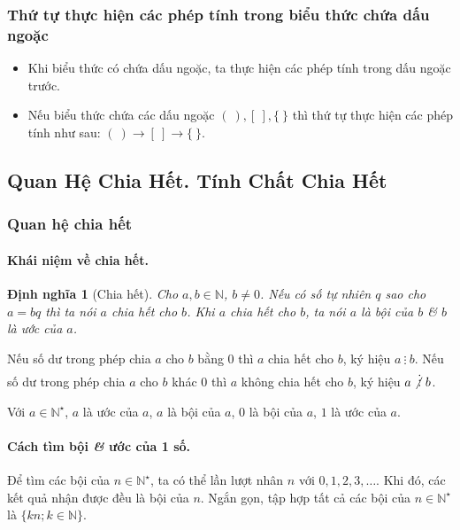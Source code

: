 \documentclass{article}
\numberwithin{equation}{section}
\newtheorem{definition}{Định nghĩa}[section]
\begin{document}
\subsubsection{Thứ tự thực hiện các phép tính trong biểu thức chứa dấu ngoặc}
\begin{tcolorbox}
	\begin{itemize}
		\item Khi biểu thức có chứa dấu ngoặc, ta thực hiện các phép tính trong dấu ngoặc trước.
		\item Nếu biểu thức chứa các dấu ngoặc $(\ ),[\ ],\{\ \}$ thì thứ tự thực hiện các phép tính như sau: $(\ )\to[\ ]\to\{\ \}$.
	\end{itemize}	
\end{tcolorbox}

\subsection{Quan Hệ Chia Hết. Tính Chất Chia Hết}

\subsubsection{Quan hệ chia hết}

\paragraph{Khái niệm về chia hết.}
\begin{definition}[Chia hết]
	Cho $a,b\in\mathbb{N}$, $b\ne 0$. Nếu có số tự nhiên $q$ sao cho $a = bq$ thì ta nói \emph{$a$ chia hết cho $b$}. Khi $a$ chia hết cho $b$, ta nói $a$ là \emph{bội} của $b$ \textit{\&} $b$ là \emph{ước} của $a$.
\end{definition}
Nếu số dư trong phép chia $a$ cho $b$ bằng 0 thì $a$ chia hết cho $b$, ký hiệu $a\ \vdots\ b$. Nếu số dư trong phép chia $a$ cho $b$ khác 0 thì $a$ không chia hết cho $b$, ký hiệu $a\not\vdots\ b$.

Với $a\in\mathbb{N}^\star$, $a$ là ước của $a$, $a$ là bội của $a$, 0 là bội của $a$, $1$ là ước của $a$.

\paragraph{Cách tìm bội \textit{\&} ước của 1 số.} Để tìm các bội của $n\in\mathbb{N}^\star$, ta có thể lần lượt nhân $n$ với $0,1,2,3,\ldots$. Khi đó, các kết quả nhận được đều là bội của $n$. Ngắn gọn, tập hợp tất cả các bội của $n\in\mathbb{N}^\star$ là $\{kn;k\in\mathbb{N}\}$.
\end{document}
